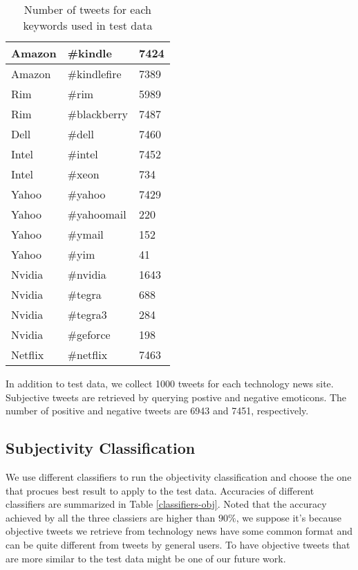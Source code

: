 \documentclass[12pt]{article}
\begin{document}
\begin{table}
\begin{center}
\begin{tabular}{ | l || l | l | }
        Amazon &  \#kindle & 7424 \\ \hline
        Amazon &  \#kindlefire & 7389 \\ \hline
        Rim &  \#rim & 5989 \\ \hline
        Rim &  \#blackberry & 7487 \\ \hline
        Dell &  \#dell & 7460 \\ \hline
        Intel &  \#intel & 7452 \\ \hline
        Intel &  \#xeon & 734 \\ \hline
        Yahoo &  \#yahoo & 7429 \\ \hline
        Yahoo &  \#yahoomail & 220 \\ \hline
        Yahoo &  \#ymail & 152 \\ \hline
        Yahoo &  \#yim & 41 \\ \hline
        Nvidia &  \#nvidia & 1643 \\ \hline
        Nvidia &  \#tegra & 688 \\ \hline
        Nvidia &  \#tegra3 & 284 \\ \hline
        Nvidia &  \#geforce & 198 \\ \hline
        Netflix &  \#netflix & 7463 \\ \hline
        \hline
    \end{tabular}
\caption{Number of tweets for each keywords used in test data}
\label{keywords-tweet-numbers} %
\end{center}
\end{table}

In addition to test data, we collect 1000 tweets for each technology news site. Subjective tweets are retrieved by querying postive and negative emoticons. The number of positive and negative tweets are 6943 and 7451, respectively.

\subsection{Subjectivity Classification}
We use different classifiers to run the objectivity classification and choose the one that procues best result to apply to the test data. Accuracies of different classifiers are summarized in Table \ref{classifiers-obj}. Noted that the accuracy achieved by all the three classiers are higher than $90\%$, we suppose it's because objective tweets we retrieve from technology news have some common format and can be quite different from tweets by general users. To have objective tweets that are more similar to the test data might be one of our future work.
\end{document}
